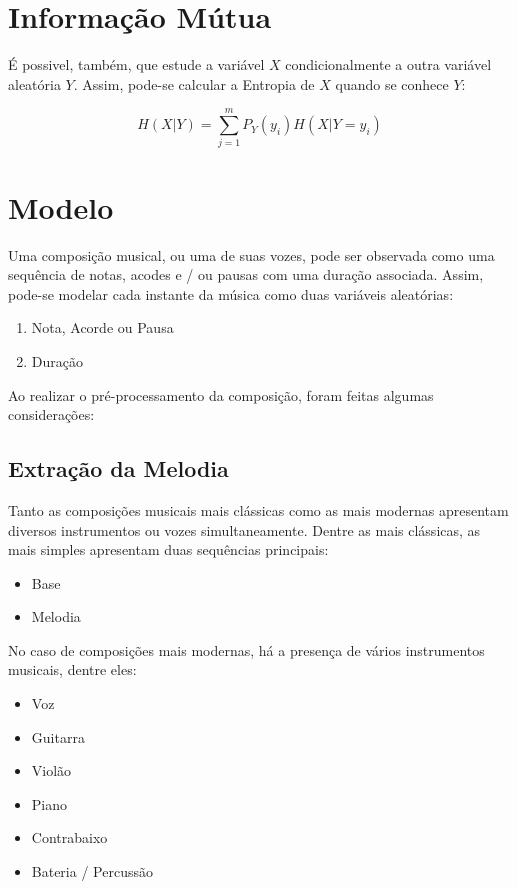 \section{Informação Mútua}

É possivel, também, que estude a variável $X$ condicionalmente a outra variável aleatória $Y$. Assim, pode-se calcular a Entropia de $X$ quando se conhece $Y$:

\begin{equation}
    H(X|Y) =  \sum_{j=1}^{m} P_Y(y_i) H(X|Y = y_i)
\end{equation}


\section{Modelo}

Uma composição musical, ou uma de suas vozes, pode ser observada como uma sequência de notas, acodes e / ou pausas com uma duração associada. Assim, pode-se modelar cada instante da música como duas variáveis aleatórias:

\begin{enumerate}
    \item Nota, Acorde ou Pausa
    \item Duração
\end{enumerate}

Ao realizar o pré-processamento da composição, foram feitas algumas considerações:

\subsection{Extração da Melodia}

Tanto as composições musicais mais clássicas como as mais modernas apresentam diversos instrumentos ou vozes simultaneamente. Dentre as mais clássicas, as mais simples apresentam duas sequências principais:

\begin{itemize}
    \item Base
    \item Melodia
\end{itemize}

No caso de composições mais modernas, há a presença de vários instrumentos musicais, dentre eles:

\begin{itemize}
    \item Voz
    \item Guitarra
    \item Violão
    \item Piano
    \item Contrabaixo
    \item Bateria / Percussão
\end{itemize}

